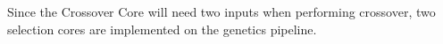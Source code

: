 Since the Crossover Core will need two inputs when performing crossover, two selection cores are implemented on the genetics pipeline.


















